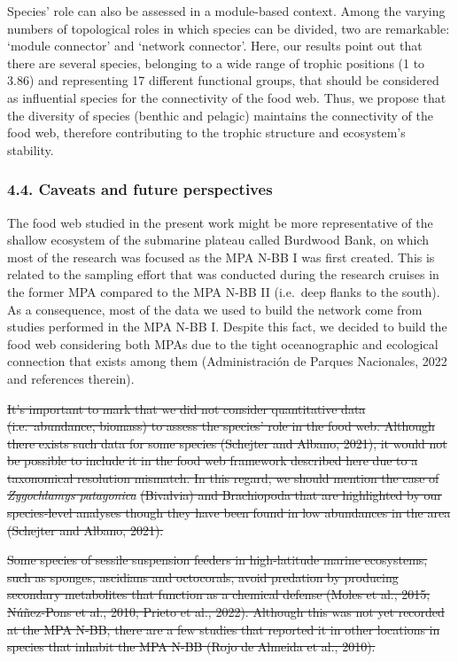 \documentclass[
]{article}
\providecommand{\DIFdel}[1]{{\protect\color{red}\sout{#1}}}                      %
\providecommand{\DIFdelbegin}{} %
\newcommand{\DIFscaledelfig}{0.5}
\newlength{\DIFdelgraphicswidth} %
\newlength{\DIFdelgraphicsheight} %
\newcommand{\DIFdelincludegraphics}[2][]{%
\sbox{\DIFdelgraphicsbox}{\DIFOincludegraphics[#1]{#2}}%
\settoboxwidth{\DIFdelgraphicswidth}{\DIFdelgraphicsbox} %
\settoboxtotalheight{\DIFdelgraphicsheight}{\DIFdelgraphicsbox} %
\scalebox{\DIFscaledelfig}{%
\parbox[b]{\DIFdelgraphicswidth}{\usebox{\DIFdelgraphicsbox}\\[-\baselineskip] \rule{\DIFdelgraphicswidth}{0em}}\llap{\resizebox{\DIFdelgraphicswidth}{\DIFdelgraphicsheight}{%
\setlength{\unitlength}{\DIFdelgraphicswidth}%
\begin{picture}(1,1)%
\thicklines\linethickness{2pt} %
{\color[rgb]{1,0,0}\put(0,0){\framebox(1,1){}}}%
{\color[rgb]{1,0,0}\put(0,0){\line( 1,1){1}}}%
{\color[rgb]{1,0,0}\put(0,1){\line(1,-1){1}}}%
\end{picture}%
}\hspace*{3pt}}} %
} %
\DeclareRobustCommand{\DIFdelbegin}{\DIFOdelbegin \let\includegraphics\DIFdelincludegraphics} %
\begin{document}
Species' role can also be assessed in a module-based context. Among the
varying numbers of topological roles in which species can be divided,
two are remarkable: `module connector' and `network connector'. Here,
our results point out that there are several species, belonging to a
wide range of trophic positions (1 to 3.86) and representing 17
different functional groups, that should be considered as influential
species for the connectivity of the food web. Thus, we propose that the
diversity of species (benthic and pelagic) maintains the connectivity of
the food web, therefore contributing to the trophic structure and
ecosystem's stability.

\subsubsection{4.4. Caveats and future
perspectives}\label{caveats-and-future-perspectives}

The food web studied in the present work might be more representative of
the shallow ecosystem of the submarine plateau called Burdwood Bank, on
which most of the research was focused as the MPA N-BB I was first
created. This is related to the sampling effort that was conducted
during the research cruises in the former MPA compared to the MPA N-BB
II (i.e.~deep flanks to the south). As a consequence, most of the data
we used to build the network come from studies performed in the MPA N-BB
I. Despite this fact, we decided to build the food web considering both
MPAs due to the tight oceanographic and ecological connection that
exists among them (Administración de Parques Nacionales, 2022 and
references therein).

\DIFdelbegin \DIFdel{It's important to mark that we did not consider quantitative data
(i.e.~abundance, biomass) to assess the species' role in the food web.
Although there exists such data for some species (Schejter and Albano,
2021), it would not be possible to include it in the food web framework
described here due to a taxonomical resolution mismatch. In this regard,
we should mention the case of }\emph{\DIFdel{Zygochlamys patagonica}} %
\DIFdel{(Bivalvia)
and Brachiopoda that are highlighted by our species-level analyses
though they have been found in low abundances in the area (Schejter and
Albano, 2021).
}%

\DIFdel{Some species of sessile suspension feeders in high-latitude marine
ecosystems, such as sponges, ascidians and octocorals, avoid predation
by producing secondary metabolites that function as a chemical defense
(Moles et al., 2015; Núñez-Pons et al., 2010; Prieto et al., 2022).
Although this was not yet recorded at the MPA N-BB, there are a few
studies that reported it in other locations in species that inhabit the
MPA N-BB (Rojo de Almeida et al., 2010).
}%
\end{document}
